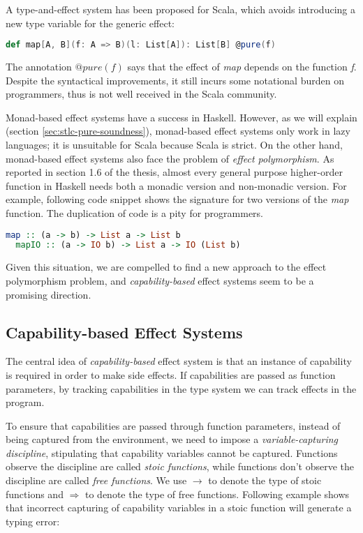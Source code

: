 A type-and-effect system has been proposed for
Scala\cite{lukas2014effect}, which avoids introducing a new type
variable for the generic effect:

\begin{lstlisting}[language=Scala]
def map[A, B](f: A => B)(l: List[A]): List[B] @pure(f)
\end{lstlisting}

The annotation $@pure(f)$ says that the effect of \emph{map} depends
on the function \emph{f}. Despite the syntactical improvements, it
still incurs some notational burden on programmers, thus is not well
received in the Scala community.

Monad-based effect systems have a success in Haskell. However, as we
will explain (section \ref{sec:stlc-pure-soundness}), monad-based
effect systems only work in lazy languages; it is unsuitable for Scala
because Scala is strict. On the other hand, monad-based effect systems
also face the problem of \emph{effect polymorphism}. As reported in
section 1.6 of the thesis\cite{lippmeier2009type}, almost every
general purpose higher-order function in Haskell needs both a monadic
version and non-monadic version. For example, following code snippet
shows the signature for two versions of the \emph{map} function. The
duplication of code is a pity for programmers.

\begin{lstlisting}[language=Haskell]
  map :: (a -> b) -> List a -> List b
  mapIO :: (a -> IO b) -> List a -> IO (List b)
\end{lstlisting}

Given this situation, we are compelled to find a new approach to the
effect polymorphism problem, and \emph{capability-based} effect
systems seem to be a promising direction.

\subsection{Capability-based Effect Systems}

The central idea of \emph{capability-based} effect system is that an
instance of capability is required in order to make side effects. If
capabilities are passed as function parameters, by tracking
capabilities in the type system we can track effects in the program.

To ensure that capabilities are passed through function parameters,
instead of being captured from the environment, we need to impose a
\emph{variable-capturing discipline}, stipulating that capability
variables cannot be captured. Functions observe the discipline are
called \emph{stoic functions}, while functions don't observe the
discipline are called \emph{free functions}. We use $\to$ to denote
the type of stoic functions and $\Rightarrow$ to denote the type of
free functions. Following example shows that incorrect capturing of
capability variables in a stoic function will generate a typing error:

